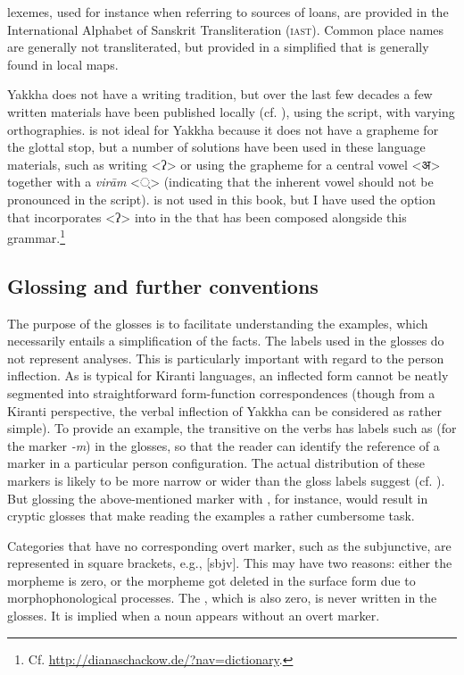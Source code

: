  lexemes, used for instance when referring to sources of loans, are provided in the International Alphabet of Sanskrit Transliteration (\textsc{iast}). Common place names are generally not transliterated, but provided in a simplified  that is generally found in local maps.

Yakkha does not have a writing tradition, but over the last few decades a few written materials have been published locally (cf. ), using the  script, with varying orthographies.  is not ideal for Yakkha because it does not have a grapheme for the glottal stop, but a number of solutions have been used in these language materials, such as writing <ʔ>  or using the grapheme for a central vowel <{\Deva अ}> together with a \emph{virām} <{\Deva  ्}>  (indicating that the inherent vowel should not be pronounced in the  script).   is not used in this book, but  I have used the option that incorporates <ʔ> into  in the  that has been composed alongside this grammar.\footnote{Cf. \url{http://dianaschackow.de/?nav=dictionary}.}


\subsection{Glossing and further conventions}

The purpose of the glosses is to facilitate understanding the examples, which necessarily entails a simplification of the facts. The labels used in the glosses do not represent analyses. This is particularly important with regard to the person inflection. As is typical for Kiranti languages, an inflected form cannot be neatly segmented into straightforward form-function correspondences (though from a  Kiranti perspective, the verbal inflection of Yakkha can be considered as rather simple). To provide an example, the transitive  on the verbs has labels such as  (for the marker \emph{-m}) in the glosses, so that the reader can identify the reference of a marker in a particular person configuration. The actual distribution of these markers is likely to be more narrow or wider than the gloss labels suggest (cf. ). But glossing the above-mentioned marker with , for instance, would result in cryptic glosses that make reading the examples a rather cumbersome task. 

Categories that have no corresponding overt marker, such as the subjunctive, are represented in square brackets, e.g., [{\sc sbjv}]. This may have two reasons: either the morpheme is zero, or the morpheme got deleted in the surface form due to morphophonological processes. The , which is also zero, is never written in the glosses. It is implied when a noun appears without an overt  marker. 

